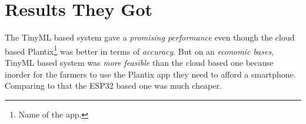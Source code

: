 \documentclass[../../main]{subfiles}
\begin{document}
\section{Results They Got} \label{sec:}

The TinyML based system gave a \emph{promising performance} even though the
cloud based Plantix\footnote{Name of the app.} was better in terms of \emph{accuracy}.
But on an \emph{economic bases}, TinyML based system was \emph{more feasible} than the
cloud based one because inorder for the farmers to use the Plantix app they need to
afford a smartphone. Comparing to that the ESP32 based one was much cheaper.

%
\end{document}
